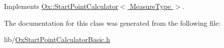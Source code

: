 Implements \hyperlink{class_ox_1_1_start_point_calculator_acd2a221872002157f232e1e7f73a1859}{Ox\-::\-Start\-Point\-Calculator$<$ Measure\-Type $>$}.



The documentation for this class was generated from the following file\-:\begin{DoxyCompactItemize}
\item 
lib/\hyperlink{_ox_start_point_calculator_basic_8h}{Ox\-Start\-Point\-Calculator\-Basic.\-h}\end{DoxyCompactItemize}
